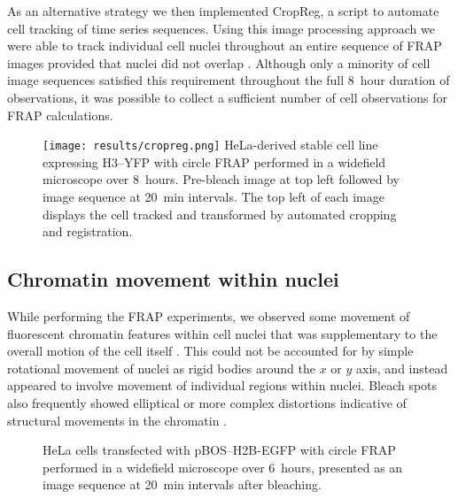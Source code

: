     As an alternative strategy we then implemented CropReg, a script 
    to automate cell tracking of time series sequences.
    Using this image processing approach we were able to track individual cell nuclei
    throughout an entire sequence of FRAP images
    provided that nuclei did not overlap .
    Although only a minority of cell image sequences satisfied this requirement
    throughout the full 8~hour duration of observations,
    it was possible to collect a sufficient number of cell observations for FRAP calculations.

    \begin{figure}
      \centering
      \texttt{[image: results/cropreg.png]}
        {
         HeLa-derived stable cell line expressing H3--YFP
         with circle FRAP performed in a widefield microscope over 8~hours.
         Pre-bleach image at top left followed by image sequence at 20~min intervals.
         The top left of each image displays the cell tracked and transformed
         by automated cropping and registration.
        }
      \label{fig:kill-frap:cropreg}
    \end{figure}

  \subsection{Chromatin movement within nuclei}

    While performing the FRAP experiments, we observed some movement of fluorescent chromatin features
    within cell nuclei that was supplementary to the overall motion of the cell itself .
    This could not be accounted for by simple rotational movement of nuclei
    as rigid bodies around the $x$ or $y$ axis, 
    and instead appeared to involve movement of individual regions within nuclei.
    Bleach spots also frequently showed elliptical or more complex distortions
    indicative of structural movements in the chromatin .

    \begin{figure}
      \centering
        {HeLa cells transfected with pBOS--H2B-EGFP with circle FRAP performed 
        in a widefield microscope over 6~hours, presented as an image sequence 
        at 20~min intervals after bleaching.}
      \label{fig:kill-frap:frap-spot-movement}
    \end{figure}

